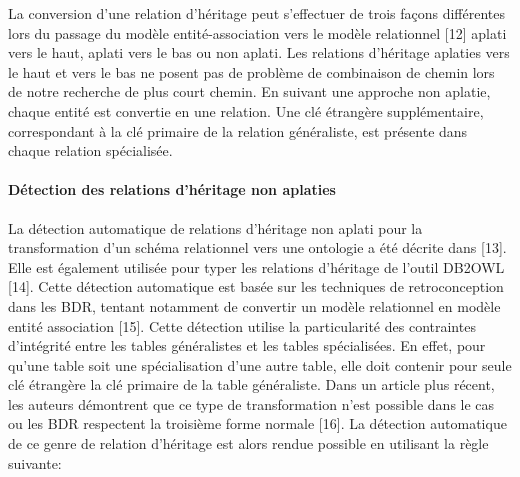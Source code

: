 La conversion d'une relation d'héritage peut s'effectuer de trois façons différentes lors du passage du modèle entité-association vers le modèle relationnel [12] aplati vers le haut, aplati vers le bas ou non aplati. Les relations d'héritage aplaties vers le haut et vers le bas ne posent pas de problème de combinaison de chemin lors de notre recherche de plus court chemin. En suivant une approche non aplatie, chaque entité est convertie en une relation.  Une clé étrangère supplémentaire, correspondant à la clé primaire de la relation généraliste, est présente dans chaque relation spécialisée. 


%

\paragraph*{Détection des relations d'héritage non aplaties}

La détection automatique de relations d'héritage non aplati pour la transformation d’un schéma relationnel vers une ontologie a été décrite dans [13]. Elle est également utilisée pour typer les relations d'héritage de l’outil DB2OWL [14]. Cette détection automatique est basée sur les techniques de retroconception dans les BDR, tentant notamment de convertir un modèle relationnel en modèle entité association [15]. Cette détection utilise la particularité des contraintes d'intégrité entre les tables généralistes et les tables spécialisées. En effet, pour qu'une table soit une spécialisation d'une autre table, elle doit contenir pour seule clé étrangère la clé primaire de la table généraliste. Dans un article plus récent, les auteurs démontrent que ce type de transformation n’est possible dans le cas ou les BDR respectent la troisième forme normale [16]. La détection automatique de ce genre de relation d'héritage est alors rendue possible en utilisant la règle suivante:


